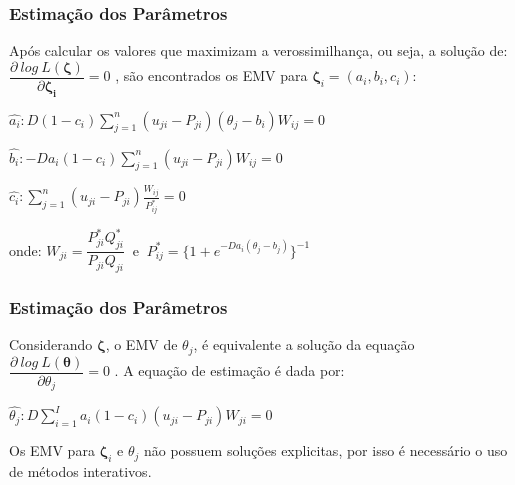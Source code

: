 \documentclass{beamer}
\begin{document}
	\begin{frame}
		
		\frametitle{Estimação dos Parâmetros}
		
		Após calcular os valores que maximizam a verossimilhança, ou seja, a solução de: $\dfrac{\partial~log~ L(\boldsymbol{\zeta})}{\partial \boldsymbol{\zeta_i}} = 0$ , são encontrados os EMV para $ \boldsymbol{\zeta}_i = (a_i, b_i , c_i )$:\newline
		
		$
		\hat{a_i}: D(1 - c_i)\sum_{j=1}^{n}(u_{ji} - P_{ji})(\theta_j - b_i)W_{ij} = 0
		$\newline
		
		$
		\hat{b_i}: -Da_i(1 - c_i)\sum_{j=1}^{n}(u_{ji} - P_{ji})W_{ij} = 0
		$\newline
		
		$ 
		\hat{c_i}: \sum_{j=1}^{n}(u_{ji} - P_{ji})\frac{W_{ij}}{P^*_{ij}} = 0
		$  \newline
		
		\begin{center} onde: \space
			$ W_{ji} = \dfrac{P_{ji}^*Q_{ji}^*}{P_{ji}Q_{ji}} ~$ e $ ~ 
			P^*_{ij} = \{1 + e^{-Da_i(\theta_j - b_j)}\}^{-1} $
		\end{center}

			
\end{frame}
	

	\begin{frame}
		
		\frametitle{Estimação dos Parâmetros }
		
		Considerando $\boldsymbol{\zeta}$, o EMV de $\theta_j$, é equivalente a solução da equação
		$\dfrac{\partial~log~ L(\boldsymbol{\theta})}{\partial \theta_j} = 0$ .
		A equação de estimação é dada por:\newline \newline
		
		
		$ \hat{\theta_j} : D\sum_{i=1}^{I}{a_i(1-c_i)(u_{ji}-P_{ji})W_{ji}} = 0 $ \newline \newline
		
		Os EMV para $ \boldsymbol{\zeta}_i$ e $\theta_j$ não possuem soluções explicitas, por isso é necessário o uso de métodos interativos.
		
	\end{frame}
	
\end{document}
